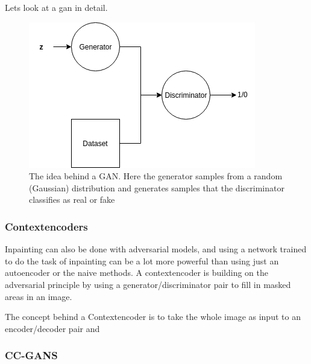 Lets look at a gan in detail. \\
\begin{figure}[ht!]
    \centering
    \includegraphics[scale=0.5]{background/figures/simpleGAN.png}
    \caption{The idea behind a GAN. Here the generator samples from a random (Gaussian) distribution and generates samples that the discriminator classifies as real or fake}
\end{figure}
    

\subsubsection{Contextencoders}
Inpainting can also be done with adversarial models, and using a network trained to do the task of inpainting can be a lot more powerful than using just an autoencoder or the naive methods.
A contextencoder is building on the adversarial principle by using a generator/discriminator pair to fill in masked areas in an image. 
    
The concept behind a Contextencoder is to take the whole image as input to an encoder/decoder pair and 
     
\subsubsection{CC-GANS}  
      

